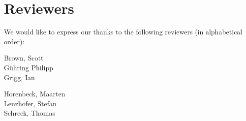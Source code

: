 \section{Reviewers}

We would like to express our thanks to the following reviewers (in alphabetical order):


\vline{}

\begin{minipage}[b]{0.5\linewidth}
\center
Brown, Scott \\
G\"uhring Philipp  \\
Grigg, Ian  \\
\end{minipage}
\begin{minipage}[b]{0.5\linewidth}
\center
Horenbeck, Maarten \\
Lenzhofer, Stefan \\
Schreck, Thomas  \\
\end{minipage}


